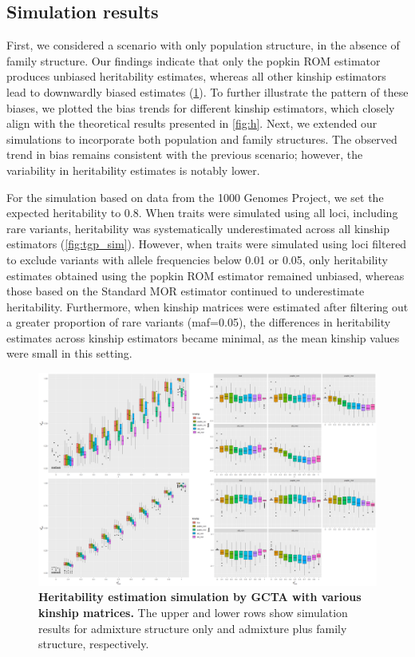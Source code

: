 \documentclass[11pt]{article}
\begin{document}
\subsection{Simulation results}
First, we considered a scenario with only population structure, in the absence of family structure. Our findings indicate that only the popkin ROM estimator produces unbiased heritability estimates, whereas all other kinship estimators lead to downwardly biased estimates (\cref{fig:Herit_sim}). To further illustrate the pattern of these biases, we plotted the bias trends for different kinship estimators, which closely align with the theoretical results presented in \cref{fig:h}. Next, we extended our simulations to incorporate both population and family structures. The observed trend in bias remains consistent with the previous scenario; however, the variability in heritability estimates is notably lower.

For the simulation based on data from the 1000 Genomes Project, we set the expected heritability to 0.8. When traits were simulated using all loci, including rare variants, heritability was systematically underestimated across all kinship estimators (\cref{fig:tgp_sim}). However, when traits were simulated using loci filtered to exclude variants with allele frequencies below 0.01 or 0.05, only heritability estimates obtained using the popkin ROM estimator remained unbiased, whereas those based on the Standard MOR estimator continued to underestimate heritability. Furthermore, when kinship matrices were estimated after filtering out a greater proportion of rare variants (maf=0.05), the differences in heritability estimates across kinship estimators became minimal, as the mean kinship values were small in this setting.


\begin{figure}[bp!]
  \centering
  \includegraphics[width=\textwidth]{data/Herit_sim_both.png}
  \caption{
    {\bf Heritability estimation simulation by GCTA with various kinship matrices.}
    The upper and lower rows show simulation results for admixture structure only and admixture plus family structure, respectively.
    }
  \label{fig:Herit_sim}
\end{figure}
\end{document}
